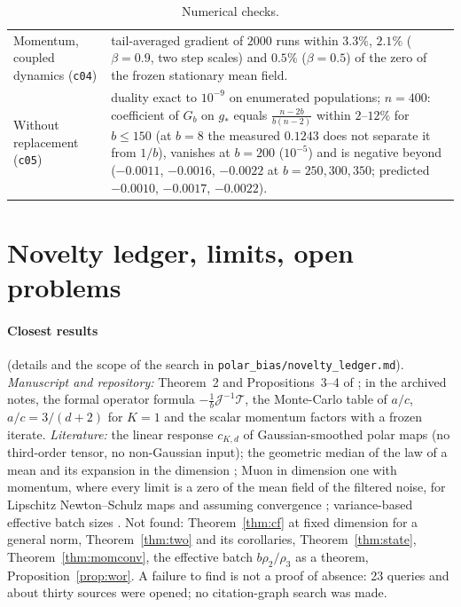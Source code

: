 \documentclass[10pt]{article}
\theoremstyle{definition}
\theoremstyle{remark}
\begin{document}
\begin{table}[h]
\begin{tabular}{@{}p{}p{}@{}}
Momentum, coupled dynamics (\texttt{c04}) & tail-averaged gradient of $2000$ runs within $3.3\%$, $2.1\%$ ($\beta=0.9$, two
step scales) and $0.5\%$ ($\beta=0.5$) of the zero of the frozen stationary mean field.\\
Without replacement (\texttt{c05}) & duality exact to $10^{-9}$ on enumerated populations; $n=400$: coefficient of $G_b$ on
$g_\ast$ equals $\frac{n-2b}{b(n-2)}$ within $2$--$12\%$ for $b\le150$ (at $b=8$ the measured $0.1243$ does not separate
it from $1/b$), vanishes at $b=200$ ($10^{-5}$) and is negative
beyond ($-0.0011$, $-0.0016$, $-0.0022$ at $b=250,300,350$; predicted $-0.0010$, $-0.0017$, $-0.0022$).\\
\bottomrule
\end{tabular}
\caption{Numerical checks.}\label{tab:checks}
\end{table}

\section{Novelty ledger, limits, open problems}\label{sec:ledger}

\paragraph{Closest results} (details and the scope of the search in \texttt{polar\_bias/novelty\_ledger.md}).
\emph{Manuscript and repository:} Theorem~2 and Propositions~3--4 of \cite{manuscript}; in the archived notes, the formal
operator formula $-\frac1b\mathcal J^{-1}\mathcal T$, the Monte-Carlo table of $a/c$, $a/c=3/(d+2)$ for $K=1$ and the
scalar momentum factors with a frozen iterate. \emph{Literature:} the linear response $c_{K,d}$ of Gaussian-smoothed
polar maps \cite{xie,chen} (no third-order tensor, no non-Gaussian input); the geometric median of the law of a mean
\cite{minsker} and its expansion in the dimension \cite{schwank}; Muon in dimension one with momentum, where every
limit is a zero of the mean field of the filtered noise, for Lipschitz Newton--Schulz maps and assuming convergence
\cite{ddj}; variance-based effective batch sizes \cite{paquette,chen}. Not found: Theorem~\ref{thm:cf} at fixed
dimension for a general norm, Theorem~\ref{thm:two} and its corollaries, Theorem~\ref{thm:state},
Theorem~\ref{thm:momconv}, the effective batch $b\rho_2/\rho_3$ as a theorem, Proposition~\ref{prop:wor}. A failure to
find is not a proof of absence: 23 queries and about thirty sources were opened; no citation-graph search was made.
\end{document}
